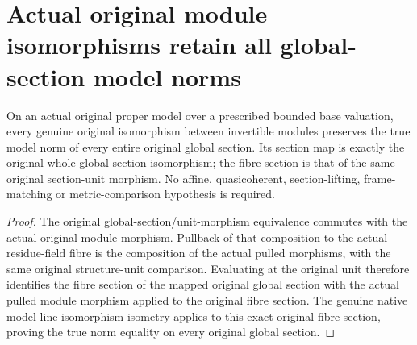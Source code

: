\section{Actual original module isomorphisms retain all global-section model norms}
\label{sec:scheme-global-section-model-norm-isometries}

\begin{theorem}
\label{thm:scheme-global-section-model-norm-isometry}
\leanok
{}
On an actual original proper model over a prescribed bounded base valuation,
every genuine original isomorphism between invertible modules preserves the
true model norm of every entire original global section. Its section map is
exactly the original whole global-section isomorphism; the fibre section is
that of the same original section-unit morphism. No affine, quasicoherent,
section-lifting, frame-matching or metric-comparison hypothesis is required.
\end{theorem}
\begin{proof}
The original global-section/unit-morphism equivalence commutes with the
actual original module morphism. Pullback of that composition to the actual
residue-field fibre is the composition of the actual pulled morphisms, with
the same original structure-unit comparison. Evaluating at the original unit
therefore identifies the fibre section of the mapped original global section
with the actual pulled module morphism applied to the original fibre section.
The genuine native model-line isomorphism isometry applies to this exact
original fibre section, proving the true norm equality on every original
global section.
\end{proof}

